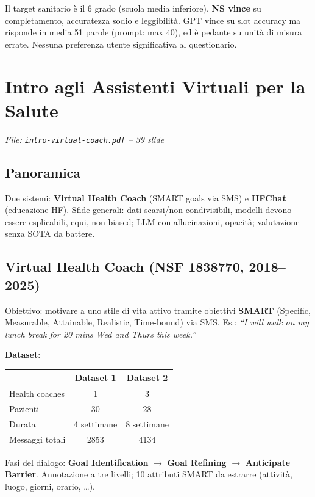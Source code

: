 \documentclass[a4paper,12pt]{article}
\begin{document}
Il target sanitario \`e il 6\textdegree{} grado (scuola media inferiore). \textbf{NS vince} su completamento, accuratezza sodio e leggibilit\`a. GPT vince su slot accuracy ma risponde in media 51 parole (prompt: max 40), ed \`e pedante su unit\`a di misura errate. Nessuna preferenza utente significativa al questionario.

\section{Intro agli Assistenti Virtuali per la Salute}
\textit{File: \texttt{intro-virtual-coach.pdf} -- 39 slide}

\subsection{Panoramica}
Due sistemi: \textbf{Virtual Health Coach} (SMART goals via SMS) e \textbf{HFChat} (educazione HF). Sfide generali: dati scarsi/non condivisibili, modelli devono essere esplicabili, equi, non biased; LLM con allucinazioni, opacit\`a; valutazione senza SOTA da battere.

\subsection{Virtual Health Coach (NSF 1838770, 2018--2025)}
Obiettivo: motivare a uno stile di vita attivo tramite obiettivi \textbf{SMART} (Specific, Measurable, Attainable, Realistic, Time-bound) via SMS. Es.: \textit{``I will walk on my lunch break for 20 mins Wed and Thurs this week.''}

\textbf{Dataset}:
\begin{center}
\begin{tabular}{lcc}
\toprule
 & \textbf{Dataset 1} & \textbf{Dataset 2} \\
\midrule
Health coaches & 1 & 3 \\
Pazienti & 30 & 28 \\
Durata & 4 settimane & 8 settimane \\
Messaggi totali & 2853 & 4134 \\
\bottomrule
\end{tabular}
\end{center}

Fasi del dialogo: \textbf{Goal Identification} $\to$ \textbf{Goal Refining} $\to$ \textbf{Anticipate Barrier}. Annotazione a tre livelli; 10 attributi SMART da estrarre (attivit\`a, luogo, giorni, orario, \ldots).
\end{document}
